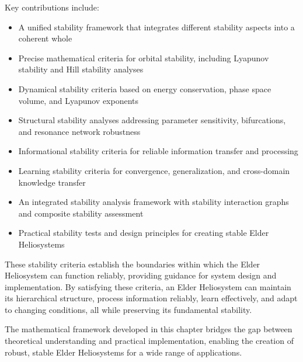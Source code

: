 Key contributions include:
\begin{itemize}
    \item A unified stability framework that integrates different stability aspects into a coherent whole
    \item Precise mathematical criteria for orbital stability, including Lyapunov stability and Hill stability analyses
    \item Dynamical stability criteria based on energy conservation, phase space volume, and Lyapunov exponents
    \item Structural stability analyses addressing parameter sensitivity, bifurcations, and resonance network robustness
    \item Informational stability criteria for reliable information transfer and processing
    \item Learning stability criteria for convergence, generalization, and cross-domain knowledge transfer
    \item An integrated stability analysis framework with stability interaction graphs and composite stability assessment
    \item Practical stability tests and design principles for creating stable Elder Heliosystems
\end{itemize}

These stability criteria establish the boundaries within which the Elder Heliosystem can function reliably, providing guidance for system design and implementation. By satisfying these criteria, an Elder Heliosystem can maintain its hierarchical structure, process information reliably, learn effectively, and adapt to changing conditions, all while preserving its fundamental stability.

The mathematical framework developed in this chapter bridges the gap between theoretical understanding and practical implementation, enabling the creation of robust, stable Elder Heliosystems for a wide range of applications.